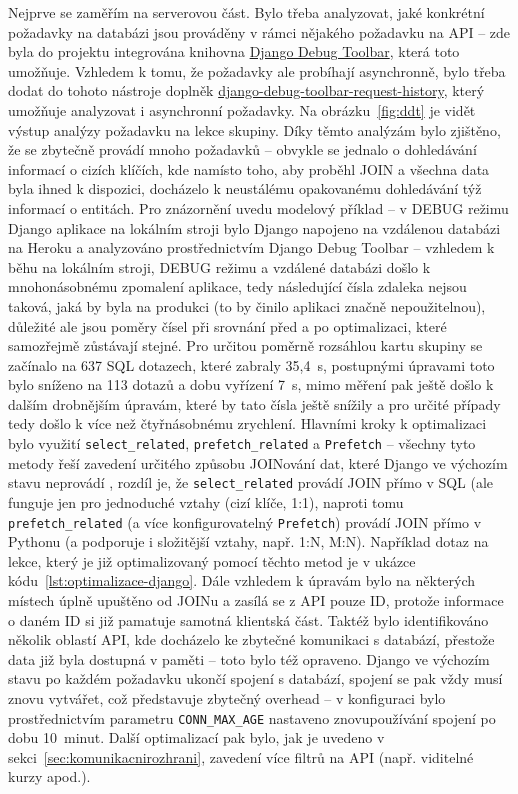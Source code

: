 Nejprve se zaměřím na serverovou část. Bylo třeba analyzovat, jaké konkrétní požadavky na databázi jsou prováděny v rámci nějakého požadavku na API -- zde byla do projektu integrována knihovna \href{https://django-debug-toolbar.readthedocs.io/en/latest/}{Django Debug Toolbar}, která toto umožňuje. Vzhledem k tomu, že požadavky ale probíhají asynchronně, bylo třeba dodat do tohoto nástroje doplněk \href{https://github.com/djsutho/django-debug-toolbar-request-history}{django-debug-toolbar-request-history}, který umožňuje analyzovat i asynchronní požadavky. Na obrázku~\ref{fig:ddt} je vidět výstup analýzy požadavku na lekce skupiny. Díky těmto analýzám bylo zjištěno, že se zbytečně provádí mnoho požadavků -- obvykle se jednalo o dohledávání informací o cizích klíčích, kde namísto toho, aby proběhl JOIN a všechna data byla ihned k dispozici, docházelo k neustálému opakovanému dohledávání týž informací o entitách. Pro znázornění uvedu modelový příklad -- v DEBUG režimu Django aplikace na lokálním stroji bylo Django napojeno na vzdálenou databázi na Heroku a analyzováno prostřednictvím Django Debug Toolbar -- vzhledem k běhu na lokálním stroji, DEBUG režimu a vzdálené databázi došlo k mnohonásobnému zpomalení aplikace, tedy následující čísla zdaleka nejsou taková, jaká by byla na produkci (to by činilo aplikaci značně nepoužitelnou), důležité ale jsou poměry čísel při srovnání před a po optimalizaci, které samozřejmě zůstávají stejné. Pro určitou poměrně rozsáhlou kartu skupiny se začínalo na 637 SQL dotazech, které zabraly 35,4~s, postupnými úpravami toto bylo sníženo na 113 dotazů a dobu vyřízení 7~s, mimo měření pak ještě došlo k dalším drobnějším úpravám, které by tato čísla ještě snížily a pro určité případy tedy došlo k více než čtyřnásobnému zrychlení. Hlavními kroky k optimalizaci bylo využití \verb|select_related|, \verb|prefetch_related| a \verb|Prefetch| -- všechny tyto metody řeší zavedení určitého způsobu JOINování dat, které Django ve výchozím stavu neprovádí \cite{django-optimalizace}, rozdíl je, že \verb|select_related| provádí JOIN přímo v SQL (ale funguje jen pro jednoduché vztahy (cizí klíče, 1:1), naproti tomu \verb|prefetch_related| (a více konfigurovatelný \verb|Prefetch|) provádí JOIN přímo v Pythonu (a podporuje i složitější vztahy, např. 1:N, M:N). Například dotaz na lekce, který je již optimalizovaný pomocí těchto metod je v ukázce kódu~\ref{lst:optimalizace-django}. Dále vzhledem k úpravám bylo na některých místech úplně upuštěno od JOINu a zasílá se z API pouze ID, protože informace o daném ID si již pamatuje samotná klientská část. Taktéž bylo identifikováno několik oblastí API, kde docházelo ke zbytečné komunikaci s databází, přestože data již byla dostupná v paměti -- toto bylo též opraveno. Django ve výchozím stavu po každém požadavku ukončí spojení s databází, spojení se pak vždy musí znovu vytvářet, což představuje zbytečný overhead \cite{django-db} -- v konfiguraci bylo prostřednictvím parametru \verb|CONN_MAX_AGE| nastaveno znovupoužívání spojení po dobu 10~minut. Další optimalizací pak bylo, jak je uvedeno v sekci~\ref{sec:komunikacnirozhrani}, zavedení více filtrů na API (např. viditelné kurzy apod.).

